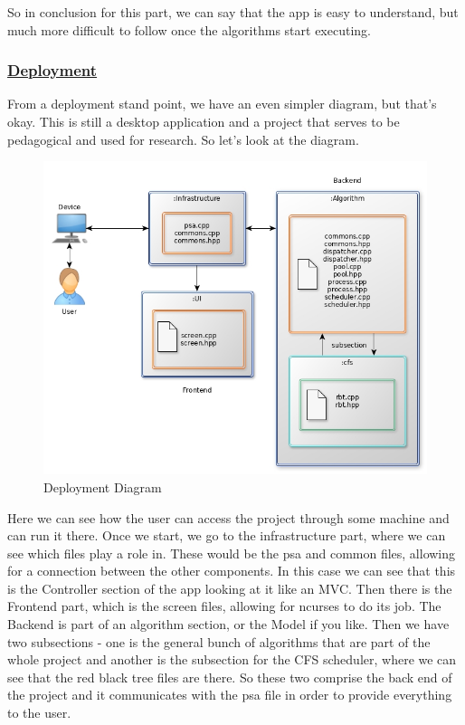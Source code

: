 \documentclass{article}
\begin{document}
So in conclusion for this part, we can say that the app is easy to understand, but much more difficult to follow once the algorithms start executing.

\subsubsection{\underline{Deployment}}

From a deployment stand point, we have an even simpler diagram, but that's okay. This is still a desktop application and a project that serves to be pedagogical and used for research. So let's look at the diagram.

\begin{figure}[H]
  \centering
  \includegraphics[width=\linewidth]{./pics/deployment.jpg}
  \caption{Deployment Diagram}
  \label{fig:Deployment Diagram}
\end{figure}

Here we can see how the user can access the project through some machine and can run it there. Once we start, we go to the infrastructure part, where we can see which files play a role in. These would be the psa and common files, allowing for a connection between the other components. In this case we can see that this is the Controller section of the app looking at it like an MVC. Then there is the Frontend part, which is the screen files, allowing for ncurses to do its job. The Backend is part of an algorithm section, or the Model if you like. Then we have two subsections - one is the general bunch of algorithms that are part of the whole project and another is the subsection for the CFS scheduler, where we can see that the red black tree files are there. So these two comprise the back end of the project and it communicates with the psa file in order to provide everything to the user.
\end{document}
